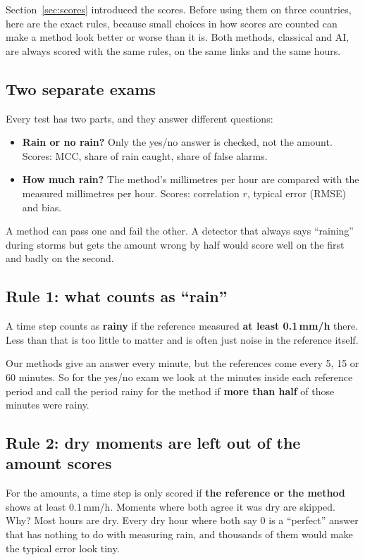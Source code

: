 Section~\ref{sec:scores} introduced the scores. Before using them on three countries, here are the exact rules, because
small choices in how scores are counted can make a method look better or worse than it is. Both methods, classical and AI,
are always scored with the same rules, on the same links and the same hours.

\subsection{Two separate exams}
Every test has two parts, and they answer different questions:
\begin{itemize}
\item \textbf{Rain or no rain?} Only the yes/no answer is checked, not the amount. Scores: MCC, share of rain caught,
share of false alarms.
\item \textbf{How much rain?} The method's millimetres per hour are compared with the measured millimetres per hour. Scores:
correlation $r$, typical error (RMSE) and bias.
\end{itemize}
A method can pass one and fail the other. A detector that always says ``raining'' during storms but gets the amount
wrong by half would score well on the first and badly on the second.

\subsection{Rule 1: what counts as ``rain''}
A time step counts as \textbf{rainy} if the reference measured \textbf{at least 0.1\,mm/h} there. Less than that is
too little to matter and is often just noise in the reference itself.

Our methods give an answer every minute, but the references come every 5, 15 or 60 minutes. So for the yes/no exam we
look at the minutes inside each reference period and call the period rainy for the method if \textbf{more than half}
of those minutes were rainy.

\subsection{Rule 2: dry moments are left out of the amount scores}
For the amounts, a time step is only scored if \textbf{the reference or the method} shows at least 0.1\,mm/h. Moments
where both agree it was dry are skipped. Why? Most hours are dry. Every dry hour where both say 0 is a ``perfect''
answer that has nothing to do with measuring rain, and thousands of them would make the typical error look tiny.

